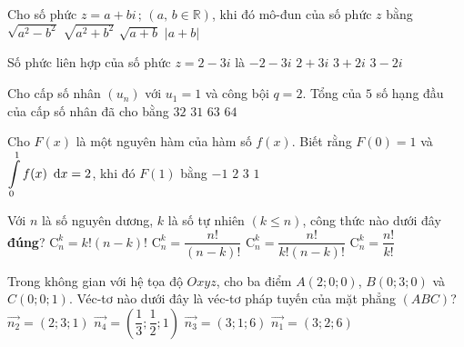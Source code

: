 \begin{ex}%
	Cho số phức $z=a+bi\,;\,( a,\,b\in \mathbb{R} )$, khi đó mô-đun của số phức $z$ bằng
	\choice
	{$\sqrt{a^2-b^2}$ }
	{\True $\sqrt{a^2+b^2}$}
	{$\sqrt{a+b}$}
	{$\left| a+b \right|$}
\end{ex}
\begin{ex}%
	Số phức liên hợp của số phức $z=2-3i$ là
	\choice
	{$-2-3i$}
	{\True $2+3i$}
	{$3+2i$}
	{$3-2i$}
\end{ex}
\begin{ex}%
	Cho cấp số nhân $( u_n )$ với $u_1=1$ và công bội $q=2$. Tổng của $5$ số hạng đầu của cấp số nhân đã cho bằng 
	\choice
	{$32$ }
	{\True $31$}
	{$63$}
	{$64$}
\end{ex}
\begin{ex}%
	Cho $F( x )$ là một nguyên hàm của hàm số $f( x )$. Biết rằng $F( 0 )=1$ và $\displaystyle\int\limits_0^1{f( x )} \text{\, d}x=2$, khi đó $F( 1 )$ bằng 
	\choice
	{$-1$}
	{$2$}
	{\True $3$}
	{$1$}
\end{ex}
\begin{ex}%
	Với $n$ là số nguyên dương, $k$ là số tự nhiên $( k\le n )$, công thức nào dưới đây \textbf{đúng}?
	\choice
	{$\mathrm{C}_n^k=k!( n-k )!$ }
	{$\mathrm{C}_n^k=\dfrac{n!}{( n-k )!}$}
	{\True $\mathrm{C}_n^k=\dfrac{n!}{k!( n-k )!}$ }
	{$\mathrm{C}_n^k=\dfrac{n!}{k!}$}
\end{ex}
\begin{ex}%
	Trong không gian với hệ tọa độ $Oxyz$, cho ba điểm $A( 2;0;0 )$, $B( 0;3;0 )$ và $C( 0;0;1 )$. Véc-tơ nào dưới đây là véc-tơ pháp tuyến của mặt phẳng $( ABC )$?
	\choice
	{$\overrightarrow{n_2}=( 2;3;1 )$}
	{$\overrightarrow{n_4}=( \dfrac{1}{3};\dfrac{1}{2};1 )$}
	{$\overrightarrow{n_3}=( 3;1;6 )$}
	{\True $\overrightarrow{n_1}=( 3;2;6 )$}
\end{ex}
